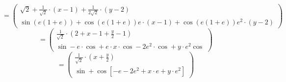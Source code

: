 \documentclass[ngerman, a4paper]{scrartcl}
\begin{document}
	\[
		=
		\begin{pmatrix}
			\sqrt{2} + \frac{1}{\sqrt{2}}\cdot(x-1) + \frac{1}{2\sqrt{2}}\cdot(y-2)\\
			\sin(e(1 + e)) + \cos(e(1 + e))e\cdot(x-1) + \cos(e(1 + e))e^2\cdot(y-2)
		\end{pmatrix}
	\]
	\[
		=
		\begin{pmatrix}
			\frac{1}{\sqrt{2}}\cdot(2+x-1+\frac{y}{2}-1)\\
			\sin -e\cdot\cos + e\cdot x\cdot \cos -2e^2\cdot \cos + y \cdot e^2 \cos
		\end{pmatrix}
	\]
	\[
	=
	\begin{pmatrix}
		\frac{1}{\sqrt{2}}\cdot(x+\frac{y}{2})\\
		\sin + \cos\left[-e - 2e^2 + x\cdot e + y\cdot e^2 \right] 
	\end{pmatrix}
	\]
	
\end{document}
